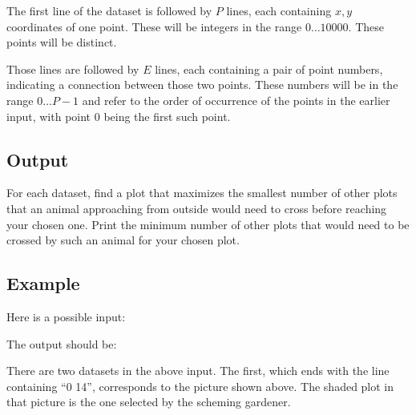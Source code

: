 The first line of the dataset is followed by $P$ lines, each
containing $x,y$ coordinates of one point. These will be integers in the
range $0 \ldots \num{10000}$. These points will be distinct.

Those lines are followed by $E$ lines, each containing a pair of point
numbers, indicating a connection between those two points. These
numbers will be in the range $0\ldots P-1$ and refer to the order of
occurrence of the points in the earlier input, with point $0$ being the
first such point.


\subsection*{Output}

For each dataset, find a plot that maximizes the smallest number of
other plots that an animal approaching from outside would need to
cross before reaching your chosen one. Print the minimum number of
other plots that would need to be crossed by such an animal for your
chosen plot.


\subsection*{Example}


Here is a possible input:



The output should be:



There are two datasets in the above input. The first, which ends with
the line containing ``0 14'', corresponds to the picture shown
above. The shaded plot in that picture is the one selected by the
scheming gardener.
